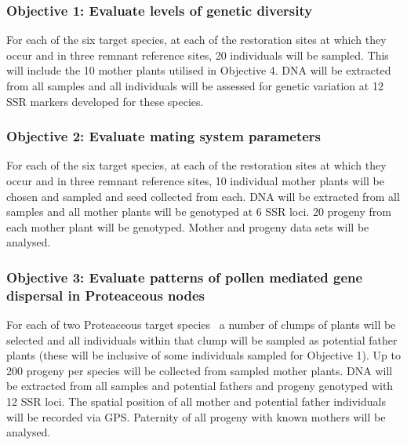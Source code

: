 \documentclass[version=last,
    paper=a4,                               %
    10pt,                                   %
    dvipsnames,
    oneside,                              %
    headings=openany,                       %
    open=any,
    BCOR=7mm,                               %
    DIV=15,     %
]{scrbook}
\begin{document}
\hypertarget{objective-1-evaluate-levels-of-genetic-diversity}{%
\subsubsection{Objective 1: Evaluate levels of genetic
diversity}\label{objective-1-evaluate-levels-of-genetic-diversity}}

For each of the six target species, at each of the restoration sites at
which they occur and in three remnant reference sites, 20 individuals
will be sampled. This will include the 10 mother plants utilised in
Objective 4. DNA will be extracted from all samples and all individuals
will be assessed for genetic variation at 12 SSR markers developed for
these species.

\hypertarget{objective-2-evaluate-mating-system-parameters}{%
\subsubsection{Objective 2: Evaluate mating system
parameters}\label{objective-2-evaluate-mating-system-parameters}}

For each of the six target species, at each of the restoration sites at
which they occur and in three remnant reference sites, 10 individual
mother plants will be chosen and sampled and seed collected from each.
DNA will be extracted from all samples and all mother plants will be
genotyped at 6 SSR loci. 20 progeny from each mother plant will be
genotyped. Mother and progeny data sets will be analysed.

\hypertarget{objective-3-evaluate-patterns-of-pollen-mediated-gene-dispersal-in-proteaceous-nodes}{%
\subsubsection{Objective 3: Evaluate patterns of pollen mediated gene
dispersal in Proteaceous
nodes}\label{objective-3-evaluate-patterns-of-pollen-mediated-gene-dispersal-in-proteaceous-nodes}}

For each of two Proteaceous target species~ a number of clumps of plants
will be selected and all individuals within that clump will be sampled
as potential father plants (these will be inclusive of some individuals
sampled for Objective 1). Up to 200 progeny per species will be
collected from sampled mother plants. DNA will be extracted from all
samples and potential fathers and progeny genotyped with 12 SSR loci.
The spatial position of all mother and potential father individuals will
be recorded via GPS. Paternity of all progeny with known mothers will be
analysed.
\end{document}

